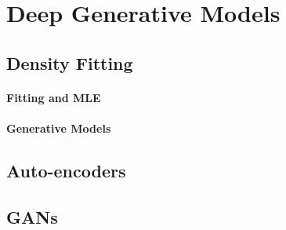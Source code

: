 \section{Deep Generative Models}


\subsection{Density Fitting}

\paragraph{Fitting and MLE}

\paragraph{Generative Models}

\subsection{Auto-encoders}

\subsection{GANs}